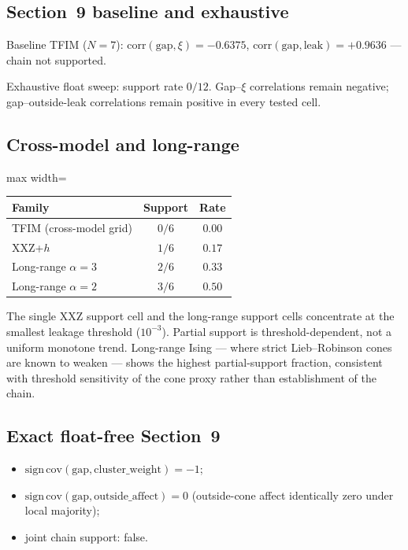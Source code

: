 \documentclass[11pt]{article}
\begin{document}
\subsection{Section~9 baseline and exhaustive}

Baseline TFIM ($N=7$):
$\mathrm{corr}(\mathrm{gap},\xi)=-0.6375$,
$\mathrm{corr}(\mathrm{gap},\mathrm{leak})=+0.9636$
--- chain not supported.

Exhaustive float sweep: support rate $0/12$.
Gap--$\xi$ correlations remain negative; gap--outside-leak correlations
remain positive in every tested cell.

\subsection{Cross-model and long-range}

\begin{center}
\begin{adjustbox}{max width=\linewidth}\begin{tabular}{lcc}
\toprule
Family & Support & Rate \\
\midrule
TFIM (cross-model grid) & $0/6$ & $0.00$ \\
XXZ+$h$ & $1/6$ & $0.17$ \\
Long-range $\alpha=3$ & $2/6$ & $0.33$ \\
Long-range $\alpha=2$ & $3/6$ & $0.50$ \\
\bottomrule
\end{tabular}\end{adjustbox}
\end{center}

The single XXZ support cell and the long-range support cells concentrate
at the smallest leakage threshold ($10^{-3}$).  Partial support is
threshold-dependent, not a uniform monotone trend.  Long-range Ising
--- where strict Lieb--Robinson cones are known to weaken --- shows the
highest partial-support fraction, consistent with threshold sensitivity
of the cone proxy rather than establishment of the chain.

\subsection{Exact float-free Section~9}

\begin{itemize}[leftmargin=1.4em,itemsep=2pt]
  \item $\mathrm{sign}\,\mathrm{cov}(\mathrm{gap},\mathrm{cluster\_weight})=-1$;
  \item $\mathrm{sign}\,\mathrm{cov}(\mathrm{gap},\mathrm{outside\_affect})=0$
        (outside-cone affect identically zero under local majority);
  \item joint chain support: false.
\end{itemize}
\end{document}
